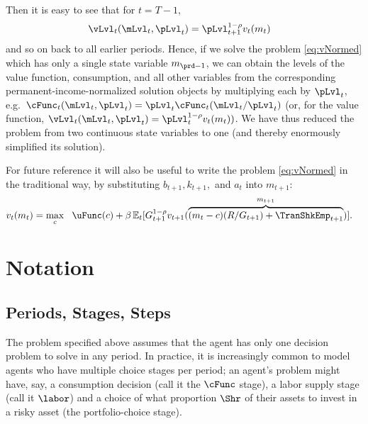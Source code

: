 \documentclass[titlepage, headings=optiontotocandhead]{Resources/texmf-local/tex/latex/econtex}
\begin{document}
Then it is easy to see that for $t=T-1$, 
\begin{equation*}\begin{gathered}\begin{aligned}
      \vLvl_{t}(\mLvl_{t},\pLvl_{t}) & =  \pLvl_{t+1}^{1-\rho}v_{t}(m_{t})
    \end{aligned}\end{gathered}\end{equation*}
and so on back to all earlier periods.  Hence, if we solve the problem \eqref{eq:vNormed} which has only a single state variable $m_{\prd-1}$, we can obtain the levels of the value function, consumption, and all other variables from the corresponding permanent-income-normalized solution objects by multiplying each by $\pLvl_{t}$, e.g.\ $\cFunc_{t}(\mLvl_{t},\pLvl_{t})=\pLvl_{t}\cFunc_{t}(\mLvl_{t}/\pLvl_{t})$ (or, for the value function, $\vLvl _{t}(\mLvl_{t},\pLvl_{t}) = \pLvl_{t}^{1-\rho}v_{t}(m_{t}))$.  We have thus reduced the problem from two continuous state variables to one (and thereby enormously simplified its solution).

For future reference it will also be useful to write the problem \eqref{eq:vNormed} in the traditional way, by substituting $b_{t+1},k_{t+1},$ and $a_{t}$ into $m_{t+1}$:
\begin{equation}\begin{gathered}\begin{aligned}
      v_{t}(m_{t}) & = \max_{c} ~~ \uFunc(c)+ \beta \Ex_{t}[ G_{t+1}^{1-\rho}v_{t+1}(\overbrace{(m_{t}-c)(R/G_{t+1})+\TranShkEmp_{t+1}}^{m_{t+1}})] \label{eq:vusual}.
    \end{aligned}\end{gathered}\end{equation}



\hypertarget{notation}{}
\section{Notation}\label{sec:notation}

\subsection{Periods, Stages, Steps}

The problem specified above assumes that the agent has only one decision problem to solve in any {period}.  In practice, it is increasingly common to model agents who have multiple choice {stage}s per {period}; an agent's problem might have, say, a consumption decision (call it the $\cFunc$ {stage}), a labor supply {stage} (call it $\labor$) and a choice of what proportion $\Shr$ of their assets to invest in a risky asset (the portfolio-choice {stage}).
\end{document}
